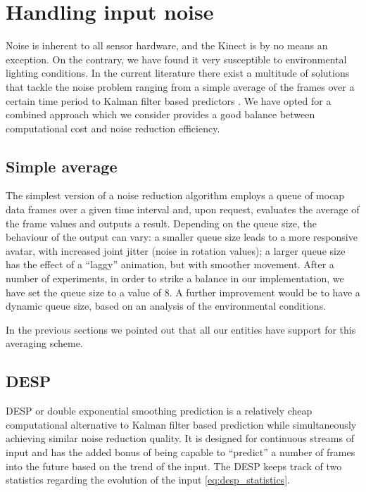 \documentclass[a4paper, 12pt]{amsart}
\begin{document}
\clearpage

\section{Handling input noise}

Noise is inherent to all sensor hardware, and the Kinect is by no means an exception. On the contrary, we have found it very susceptible to environmental lighting conditions. In the current literature there exist a multitude of solutions that tackle the noise problem ranging from a simple average of the frames over a certain time period to Kalman filter based predictors \cite{bib_kalman}. We have opted for a combined approach which we consider provides a good balance between computational cost and noise reduction efficiency.

\subsection{Simple average}

The simplest version of a noise reduction algorithm employs a queue of mocap data frames over a given time interval and, upon request, evaluates the average of the frame values and outputs a result. Depending on the queue size, the behaviour of the output can vary: a smaller queue size leads to a more responsive avatar, with increased joint jitter (noise in rotation values); a larger queue size has the effect of a ``laggy'' animation, but with smoother movement. After a number of experiments, in order to strike a balance in our implementation, we have set the queue size to a value of 8. A further improvement would be to have a dynamic queue size, based on an analysis of the environmental conditions.

In the previous sections we pointed out that all our entities have support for this averaging scheme.

\subsection{DESP}

DESP or double exponential smoothing prediction \cite{bib_desp} is a relatively cheap computational alternative to Kalman filter based prediction while simultaneously achieving similar noise reduction quality. It is designed for continuous streams of input and has the added bonus of being capable to ``predict'' a number of frames into the future based on the trend of the input. The DESP keeps track of two statistics regarding the evolution of the input \eqref{eq:desp_statistics}.
\end{document}
